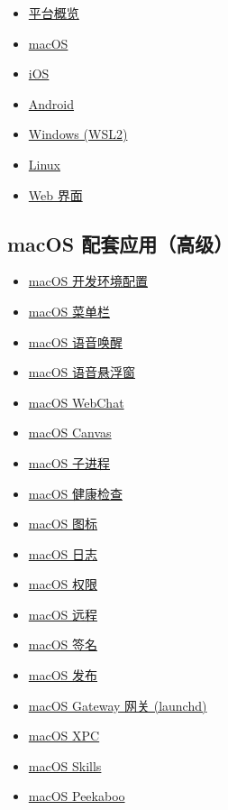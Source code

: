\begin{itemize}
  \item \href{/platforms}{平台概览}
  \item \href{/platforms/macos}{macOS}
  \item \href{/platforms/ios}{iOS}
  \item \href{/platforms/android}{Android}
  \item \href{/platforms/windows}{Windows (WSL2)}
  \item \href{/platforms/linux}{Linux}
  \item \href{/web}{Web 界面}
\end{itemize}


\subsection{macOS 配套应用（高级）}


\begin{itemize}
  \item \href{/platforms/mac/dev-setup}{macOS 开发环境配置}
  \item \href{/platforms/mac/menu-bar}{macOS 菜单栏}
  \item \href{/platforms/mac/voicewake}{macOS 语音唤醒}
  \item \href{/platforms/mac/voice-overlay}{macOS 语音悬浮窗}
  \item \href{/platforms/mac/webchat}{macOS WebChat}
  \item \href{/platforms/mac/canvas}{macOS Canvas}
  \item \href{/platforms/mac/child-process}{macOS 子进程}
  \item \href{/platforms/mac/health}{macOS 健康检查}
  \item \href{/platforms/mac/icon}{macOS 图标}
  \item \href{/platforms/mac/logging}{macOS 日志}
  \item \href{/platforms/mac/permissions}{macOS 权限}
  \item \href{/platforms/mac/remote}{macOS 远程}
  \item \href{/platforms/mac/signing}{macOS 签名}
  \item \href{/platforms/mac/release}{macOS 发布}
  \item \href{/platforms/mac/bundled-gateway}{macOS Gateway 网关 (launchd)}
  \item \href{/platforms/mac/xpc}{macOS XPC}
  \item \href{/platforms/mac/skills}{macOS Skills}
  \item \href{/platforms/mac/peekaboo}{macOS Peekaboo}
\end{itemize}


